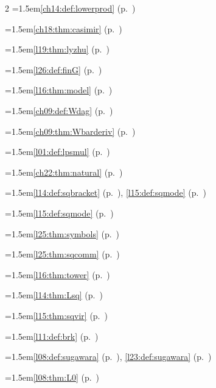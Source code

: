 \begin{multicols}{2}
\hangindent=1.5em\quad \ref{ch14:def:lowerprod} (p.~\pageref{ch14:def:lowerprod})\par
\hangindent=1.5em\quad \ref{ch18:thm:casimir} (p.~\pageref{ch18:thm:casimir})\par
\hangindent=1.5em\quad \ref{l19:thm:lyzhu} (p.~\pageref{l19:thm:lyzhu})\par
\hangindent=1.5em\quad \ref{l26:def:finG} (p.~\pageref{l26:def:finG})\par
\hangindent=1.5em\quad \ref{l16:thm:model} (p.~\pageref{l16:thm:model})\par
\hangindent=1.5em\quad \ref{ch09:def:Wdag} (p.~\pageref{ch09:def:Wdag})\par
\hangindent=1.5em\quad \ref{ch09:thm:Wbarderiv} (p.~\pageref{ch09:thm:Wbarderiv})\par
\hangindent=1.5em\quad \ref{l01:def:lpsmul} (p.~\pageref{l01:def:lpsmul})\par
\hangindent=1.5em\quad \ref{ch22:thm:natural} (p.~\pageref{ch22:thm:natural})\par
\hangindent=1.5em\quad \ref{l14:def:sqbracket} (p.~\pageref{l14:def:sqbracket}), \ref{l15:def:sqmode} (p.~\pageref{l15:def:sqmode})\par
\hangindent=1.5em\quad \ref{l15:def:sqmode} (p.~\pageref{l15:def:sqmode})\par
\hangindent=1.5em\quad \ref{l25:thm:symbols} (p.~\pageref{l25:thm:symbols})\par
\hangindent=1.5em\quad \ref{l25:thm:sqcomm} (p.~\pageref{l25:thm:sqcomm})\par
\hangindent=1.5em\quad \ref{l16:thm:tower} (p.~\pageref{l16:thm:tower})\par
\hangindent=1.5em\quad \ref{l14:thm:Lsq} (p.~\pageref{l14:thm:Lsq})\par
\hangindent=1.5em\quad \ref{l15:thm:sqvir} (p.~\pageref{l15:thm:sqvir})\par
\hangindent=1.5em\quad \ref{l11:def:brk} (p.~\pageref{l11:def:brk})\par
\hangindent=1.5em\quad \ref{l08:def:sugawara} (p.~\pageref{l08:def:sugawara}), \ref{l23:def:sugawara} (p.~\pageref{l23:def:sugawara})\par
\hangindent=1.5em\quad \ref{l08:thm:L0} (p.~\pageref{l08:thm:L0})\par

\end{multicols}
